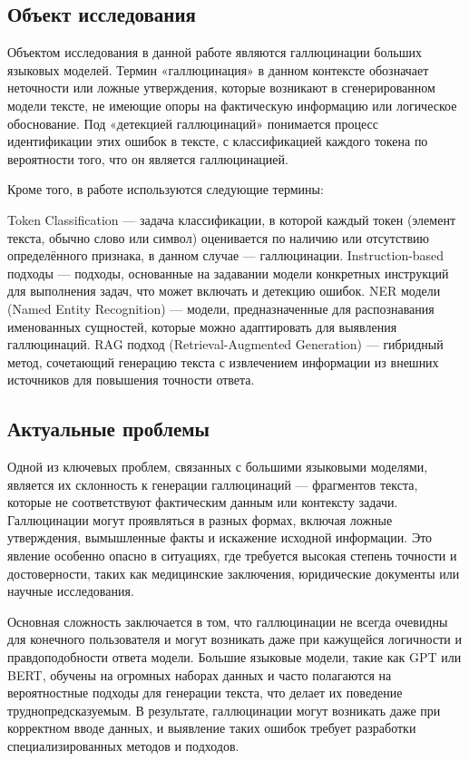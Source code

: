 \documentclass[12pt]{article}
\begin{document}
\subsection{Объект исследования}
Объектом исследования в данной работе являются галлюцинации больших языковых моделей. Термин «галлюцинация» в данном контексте обозначает неточности или ложные утверждения, которые возникают в сгенерированном модели тексте, не имеющие опоры на фактическую информацию или логическое обоснование. Под «детекцией галлюцинаций» понимается процесс идентификации этих ошибок в тексте, с классификацией каждого токена по вероятности того, что он является галлюцинацией.

Кроме того, в работе используются следующие термины:

Token Classification — задача классификации, в которой каждый токен (элемент текста, обычно слово или символ) оценивается по наличию или отсутствию определённого признака, в данном случае — галлюцинации.
Instruction-based подходы — подходы, основанные на задавании модели конкретных инструкций для выполнения задач, что может включать и детекцию ошибок.
NER модели (Named Entity Recognition) — модели, предназначенные для распознавания именованных сущностей, которые можно адаптировать для выявления галлюцинаций.
RAG подход (Retrieval-Augmented Generation) — гибридный метод, сочетающий генерацию текста с извлечением информации из внешних источников для повышения точности ответа.

\subsection{Актуальные проблемы}
Одной из ключевых проблем, связанных с большими языковыми моделями, является их склонность к генерации галлюцинаций — фрагментов текста, которые не соответствуют фактическим данным или контексту задачи. Галлюцинации могут проявляться в разных формах, включая ложные утверждения, вымышленные факты и искажение исходной информации. Это явление особенно опасно в ситуациях, где требуется высокая степень точности и достоверности, таких как медицинские заключения, юридические документы или научные исследования.

Основная сложность заключается в том, что галлюцинации не всегда очевидны для конечного пользователя и могут возникать даже при кажущейся логичности и правдоподобности ответа модели. Большие языковые модели, такие как GPT или BERT, обучены на огромных наборах данных и часто полагаются на вероятностные подходы для генерации текста, что делает их поведение труднопредсказуемым. В результате, галлюцинации могут возникать даже при корректном вводе данных, и выявление таких ошибок требует разработки специализированных методов и подходов.
\end{document}
